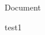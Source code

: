 \documentclass[debug=all]{stex}
\begin{document}
\noindent Document \printdocument

\begin{smodule}{test1}

\end{smodule}
\end{document}
